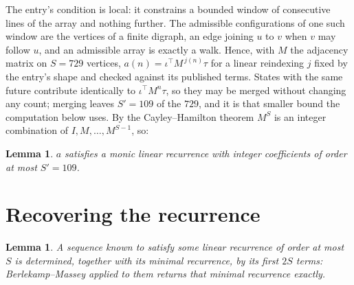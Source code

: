 \documentclass[11pt,a4paper]{article}
\theoremstyle{plain}
\newtheorem{lemma}[theorem]{Lemma}
\theoremstyle{definition}
\begin{document}
The entry's condition is local: it constrains a bounded window of consecutive lines of the
array and nothing further. The admissible configurations of one such window are the vertices
of a finite digraph, an edge joining $u$ to $v$ when $v$ may follow $u$, and an admissible
array is exactly a walk. Hence, with $M$ the adjacency matrix on $S=729$ vertices,
$a(n)=\iota^{\!\top}M^{\,j(n)}\tau$ for a linear reindexing $j$ fixed by the entry's shape
and checked against its published terms. States with the same future contribute identically to $\iota^{\!\top}M^n\tau$, so they may be merged without changing any count; merging leaves $S'=109$ of the $729$, and it is that smaller bound the computation below uses. By the Cayley--Hamilton theorem $M^{S}$ is an
integer combination of $I,M,\dots,M^{S-1}$, so:

\begin{lemma}\label{lem:cf}
$a$ satisfies a monic linear recurrence with integer coefficients of order at most
$S'=109$.
\end{lemma}

\section{Recovering the recurrence}

\begin{lemma}\label{lem:bm}
A sequence known to satisfy some linear recurrence of order at most $S$ is determined, together
with its minimal recurrence, by its first $2S$ terms: Berlekamp--Massey applied to them returns
that minimal recurrence exactly.
\end{lemma}
\end{document}
